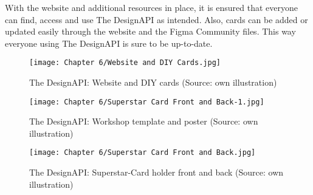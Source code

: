 With the website and additional resources in place, it is ensured that everyone can find, access and
use The DesignAPI as intended. Also, cards can be added or updated easily through the website and
the Figma Community files. This way everyone using The DesignAPI is sure to be up-to-date.

\newpage
\begin{figure}[H]
    \centering
    \texttt{[image: Chapter 6/Website and DIY Cards.jpg]}
    \caption{The DesignAPI: Website and DIY cards (Source: own illustration)}
\end{figure}

\newpage
\begin{figure}[H]
    \centering
    \texttt{[image: Chapter 6/Superstar Card Front and Back-1.jpg]}
    \caption{The DesignAPI: Workshop template and poster (Source: own illustration)}
\end{figure}

\newpage
\begin{figure}[H]
    \centering
    \texttt{[image: Chapter 6/Superstar Card Front and Back.jpg]}
    \caption{The DesignAPI: Superstar-Card holder front and back (Source: own illustration)}
\end{figure}
